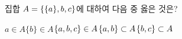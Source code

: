 집합 $A=\{\{a\}{,}\mkern3mu\mathopen{}b{,}\mkern3mu\mathopen{}c\}$에 대하여 다음 중 옳은 것은?
\begin{choicesii}{$a\in A$}{$\{b\}\in A$}{$\{a{,}\mkern3mu\mathopen{}b{,}\mkern3mu\mathopen{}c\}\in A$}{$\{a{,}\mkern3mu\mathopen{}b\}\subset A$}{$\{b{,}\mkern3mu\mathopen{}c\}\subset A$}\end{choicesii}
